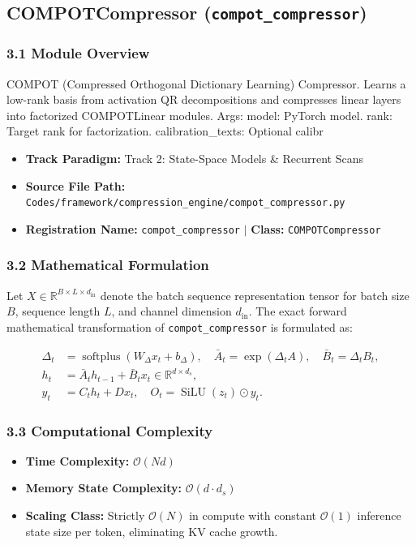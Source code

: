 \subsection{COMPOTCompressor (\texttt{compot\_compressor})}
\label{sec:app_module_compot_compressor}

\subsubsection*{3.1 Module Overview}
COMPOT (Compressed Orthogonal Dictionary Learning) Compressor. Learns a low-rank basis from activation QR decompositions and compresses linear layers into factorized COMPOTLinear modules.  Args:     model: PyTorch model.     rank: Target rank for factorization.     calibration\_texts: Optional calibr
\begin{itemize}
    \item \textbf{Track Paradigm:} Track 2: State-Space Models & Recurrent Scans
    \item \textbf{Source File Path:} \texttt{Codes/framework/compression\_engine/compot\_compressor.py}
    \item \textbf{Registration Name:} \texttt{compot\_compressor} $\mid$ \textbf{Class:} \texttt{COMPOTCompressor}
\end{itemize}

\subsubsection*{3.2 Mathematical Formulation}
Let $X \in \mathbb{R}^{B \times L \times d_{\text{in}}}$ denote the batch sequence representation tensor for batch size $B$, sequence length $L$, and channel dimension $d_{\text{in}}$. The exact forward mathematical transformation of \texttt{compot\_compressor} is formulated as:

\begin{align}
\Delta_t &= \operatorname{softplus}(W_\Delta x_t + b_\Delta), \quad \bar{A}_t = \exp(\Delta_t A), \quad \bar{B}_t = \Delta_t B_t, \\
h_t &= \bar{A}_t h_{t-1} + \bar{B}_t x_t \in \mathbb{R}^{d \times d_s}, \\
y_t &= C_t h_t + D x_t, \quad O_t = \operatorname{SiLU}(z_t) \odot y_t.
\end{align}


\subsubsection*{3.3 Computational Complexity}
\begin{itemize}
    \item \textbf{Time Complexity:} $\mathcal{O}(N d)$
    \item \textbf{Memory State Complexity:} $\mathcal{O}(d \cdot d_s)$
    \item \textbf{Scaling Class:} Strictly $\mathcal{O}(N)$ in compute with constant $\mathcal{O}(1)$ inference state size per token, eliminating KV cache growth.
\end{itemize}

